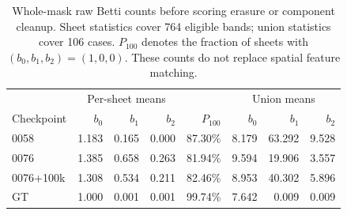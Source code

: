 \begin{table}[t]
\centering
\small
\setlength{\tabcolsep}{4pt}
\begin{tabular}{lrrrrrrr}
\toprule
& \multicolumn{3}{c}{Per-sheet means} & & \multicolumn{3}{c}{Union means} \\
Checkpoint & $b_0$ & $b_1$ & $b_2$ & $P_{100}$ & $b_0$ & $b_1$ & $b_2$ \\
\midrule
0058 & 1.183 & 0.165 & 0.000 & 87.30\% & 8.179 & 63.292 & 9.528 \\
0076 & 1.385 & 0.658 & 0.263 & 81.94\% & 9.594 & 19.906 & 3.557 \\
0076+100k & 1.308 & 0.534 & 0.211 & 82.46\% & 8.953 & 40.302 & 5.896 \\
GT & 1.000 & 0.001 & 0.001 & 99.74\% & 7.642 & 0.009 & 0.009 \\
\bottomrule
\end{tabular}
\caption{Whole-mask raw Betti counts before scoring erasure or component cleanup. Sheet statistics cover 764 eligible bands; union statistics cover 106 cases. $P_{100}$ denotes the fraction of sheets with $(b_0,b_1,b_2)=(1,0,0)$. These counts do not replace spatial feature matching.}
\label{tab:topology}
\end{table}

